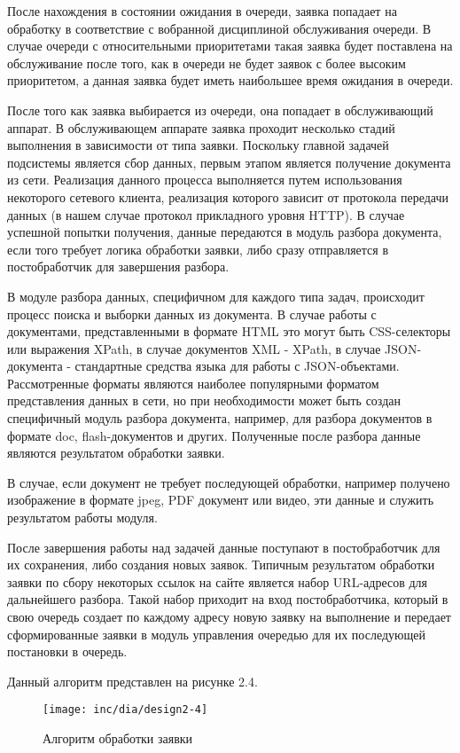 После нахождения в состоянии ожидания в очереди, заявка попадает на обработку в соответствие с вобранной дисциплиной обслуживания очереди. В случае очереди с относительными приоритетами такая заявка будет поставлена на обслуживание после того, как в очереди не будет заявок с более высоким приоритетом, а данная заявка будет иметь наибольшее время ожидания в очереди.

После того как заявка выбирается из очереди, она попадает в обслуживающий аппарат. В обслуживающем аппарате заявка проходит несколько стадий выполнения в зависимости от типа заявки. Поскольку главной задачей подсистемы является сбор данных, первым этапом является получение документа из сети. Реализация данного процесса выполняется путем использования некоторого сетевого клиента, реализация которого зависит от протокола передачи данных (в нашем случае протокол прикладного уровня HTTP). В случае успешной попытки получения, данные передаются в модуль разбора документа, если того требует логика обработки заявки, либо сразу отправляется в постобработчик для завершения разбора. 

В модуле разбора данных, специфичном для каждого типа задач, происходит процесс поиска и выборки данных из документа. В случае работы с документами, представленными в формате HTML это могут быть CSS-селекторы или выражения XPath, в случае документов XML - XPath, в случае JSON-документа - стандартные средства языка для работы с JSON-объектами. Рассмотренные форматы являются наиболее популярными форматом представления данных в сети, но при необходимости может быть создан специфичный модуль разбора документа, например, для разбора документов в формате doc, flash-документов и других. Полученные после разбора данные являются результатом обработки заявки.

В случае, если документ не требует последующей обработки, например получено изображение в формате jpeg, PDF документ или видео, эти данные и служить результатом работы модуля.

После завершения работы над задачей данные поступают в постобработчик для их сохранения, либо создания новых заявок. Типичным результатом обработки заявки по сбору некоторых ссылок на сайте является набор URL-адресов для дальнейшего разбора. Такой набор приходит на вход постобработчика, который в свою очередь создает по каждому адресу новую заявку на выполнение и передает сформированные заявки в модуль управления очередью для их последующей постановки в очередь.

Данный алгоритм представлен на рисунке 2.4.
\begin{figure}
  \centering
  \texttt{[image: inc/dia/design2-4]}
  \caption{Алгоритм обработки заявки}
  \label{fig:fig04}
\end{figure}

